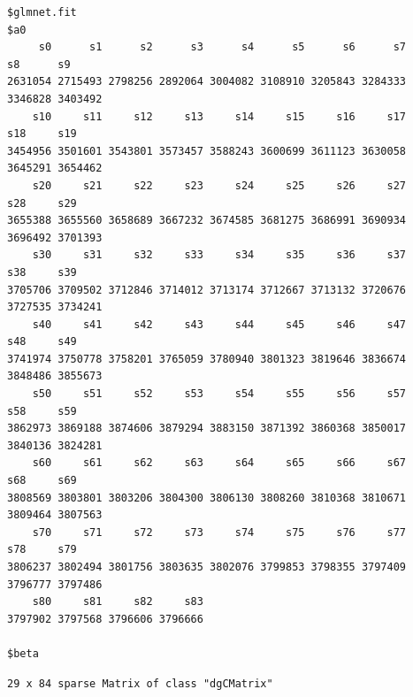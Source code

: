 \documentclass[
]{article}
\begin{document}
\begin{verbatim}
$glmnet.fit
$a0
     s0      s1      s2      s3      s4      s5      s6      s7      s8      s9 
2631054 2715493 2798256 2892064 3004082 3108910 3205843 3284333 3346828 3403492 
    s10     s11     s12     s13     s14     s15     s16     s17     s18     s19 
3454956 3501601 3543801 3573457 3588243 3600699 3611123 3630058 3645291 3654462 
    s20     s21     s22     s23     s24     s25     s26     s27     s28     s29 
3655388 3655560 3658689 3667232 3674585 3681275 3686991 3690934 3696492 3701393 
    s30     s31     s32     s33     s34     s35     s36     s37     s38     s39 
3705706 3709502 3712846 3714012 3713174 3712667 3713132 3720676 3727535 3734241 
    s40     s41     s42     s43     s44     s45     s46     s47     s48     s49 
3741974 3750778 3758201 3765059 3780940 3801323 3819646 3836674 3848486 3855673 
    s50     s51     s52     s53     s54     s55     s56     s57     s58     s59 
3862973 3869188 3874606 3879294 3883150 3871392 3860368 3850017 3840136 3824281 
    s60     s61     s62     s63     s64     s65     s66     s67     s68     s69 
3808569 3803801 3803206 3804300 3806130 3808260 3810368 3810671 3809464 3807563 
    s70     s71     s72     s73     s74     s75     s76     s77     s78     s79 
3806237 3802494 3801756 3803635 3802076 3799853 3798355 3797409 3796777 3797486 
    s80     s81     s82     s83 
3797902 3797568 3796606 3796666 

$beta
\end{verbatim}

\begin{verbatim}
29 x 84 sparse Matrix of class "dgCMatrix"
\end{verbatim}
\end{document}
